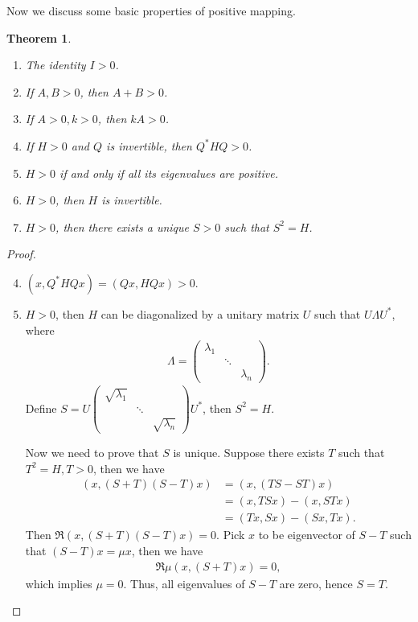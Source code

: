 \documentclass[11pt]{book}
\newtheorem{theorem}{Theorem}[section]
\theoremstyle{definition}
\numberwithin{equation}{chapter}
\begin{document}
\medskip

Now we discuss some basic properties of positive mapping. 

\medskip

\begin{theorem}\label{unique_square_root}
~\begin{enumerate}[label=(\alph*)]
    \item The identity $I > 0$.
    \item If $A, B > 0$, then $A + B > 0$.
    \item If $A > 0, k > 0$, then $k A > 0$.
    \item If $H > 0$ and $Q$ is invertible, then $Q^* H Q > 0$.
    \item $H > 0$ if and only if all its eigenvalues are positive.
    \item $H > 0$, then $H$ is invertible.
    \item $H > 0$, then there exists a unique $S > 0$ such that $S^2 = H$.
\end{enumerate}
\end{theorem}
\begin{proof}
~\begin{enumerate}[label=(\alph*)]
    \setcounter{enumi}{3}
    \item $(x, Q^* H Q x) = (Qx, HQx) > 0$.
    \setcounter{enumi}{6}
    \item $H > 0$, then $H$ can be diagonalized by a unitary matrix $U$ such that $U\Lambda U^*$, where 
    \begin{align*}
        \Lambda = \begin{pmatrix}
            \lambda_1 &  &  \\
            & \ddots &  \\
            &  & \lambda_n
        \end{pmatrix}.
    \end{align*}
    Define $S = U \begin{pmatrix}
            \sqrt{\lambda_1} &  &  \\
            & \ddots &  \\
            &  & \sqrt{\lambda_n}
        \end{pmatrix} U^*$, then $S^2  = H$. 
        
        Now we need to prove that $S$ is unique. Suppose there exists $T$ such that $T^2 = H, T > 0$, then we have
        \begin{align*}
            (x, (S+T)(S-T)x) & = (x, (TS - ST)x) \\
            & = (x, TS x) - (x, STx) \\
            & = (Tx, Sx) - (Sx, Tx).
        \end{align*}
        Then $\Re (x, (S+T)(S-T)x) = 0$. Pick $x$ to be eigenvector of $S-T$ such that $(S-T)x = \mu x$, then we have 
        \begin{align*}
            \Re \mu (x, (S+T)x) = 0,
        \end{align*}
        which implies $\mu = 0$. Thus, all eigenvalues of $S-T$ are zero, hence $S = T$.
\end{enumerate}
\end{proof}
\end{document}
